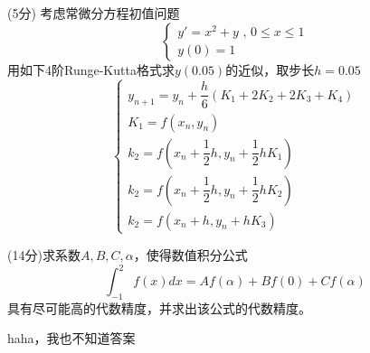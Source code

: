 \documentclass[12pt,letter]{ustcexam}
\begin{document}
\begin{problems}
\newpage

\qu (5分) 考虑常微分方程初值问题
$$ \left\{\begin{array}{l}y'=x^2+y \mbox{  ,  } 0\leqslant x\leqslant 1 \\
y(0)=1
\end{array}\right.$$
用如下4阶Runge-Kutta格式求$y(0.05)$的近似，取步长$h=0.05$
$$
\left\{\begin{array}{l}
y_{n+1}=y_n+\dfrac{h}{6}(K_1+2K_2+2K_3+K_4) \\
K_1=f(x_n,y_n) \\
k_2=f(x_n+\dfrac{1}{2}h,y_n+\dfrac{1}{2}hK_1) \\
k_2=f(x_n+\dfrac{1}{2}h,y_n+\dfrac{1}{2}hK_2) \\
k_2=f(x_n+h,y_n+hK_3)
\end{array}\right.
$$


\vspace*{0.25\textheight}

\newpage

\qu (14分)求系数$A,B,C,\alpha$，使得数值积分公式
$$
  \int_{-1}^2f(x)dx=Af(\alpha)+Bf(0)+Cf(\alpha)
$$
具有尽可能高的代数精度，并求出该公式的代数精度。
\begin{sol}
haha，我也不知道答案
\end{sol}

\newpage

\end{problems}


\clearpage
{}
\clearpage

\end{document}
